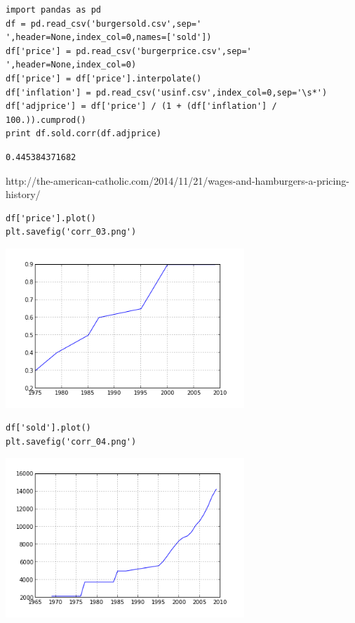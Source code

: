 \documentclass[12pt,fleqn]{article}\usepackage{../common}
\begin{document}
\begin{verbatim}
import pandas as pd
df = pd.read_csv('burgersold.csv',sep=' ',header=None,index_col=0,names=['sold'])
df['price'] = pd.read_csv('burgerprice.csv',sep=' ',header=None,index_col=0)
df['price'] = df['price'].interpolate()
df['inflation'] = pd.read_csv('usinf.csv',index_col=0,sep='\s*')
df['adjprice'] = df['price'] / (1 + (df['inflation'] / 100.)).cumprod()
print df.sold.corr(df.adjprice)
\end{verbatim}

\begin{verbatim}
0.445384371682
\end{verbatim}

http://the-american-catholic.com/2014/11/21/wages-and-hamburgers-a-pricing-history/

\begin{verbatim}
df['price'].plot()
plt.savefig('corr_03.png')
\end{verbatim}

\includegraphics[height=6cm]{corr_03.png}


\begin{verbatim}
df['sold'].plot()
plt.savefig('corr_04.png')
\end{verbatim}

\includegraphics[height=6cm]{corr_04.png}
\end{document}
